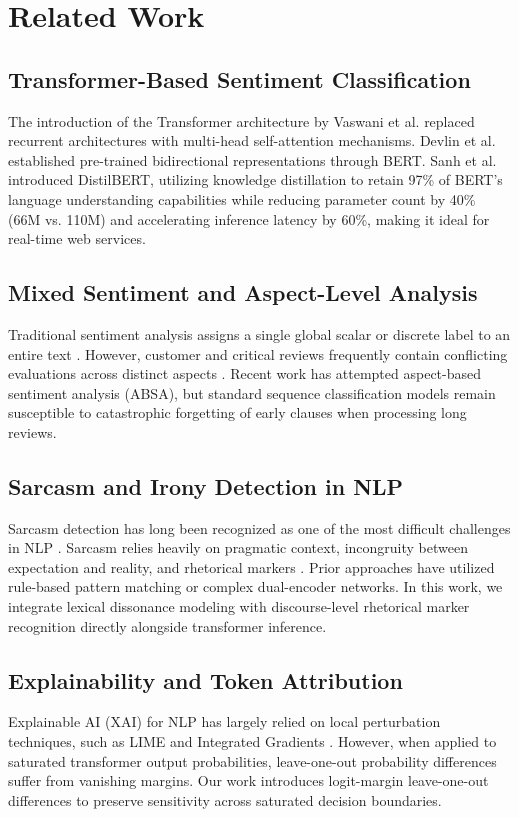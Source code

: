 \documentclass[conference]{IEEEtran}
\begin{document}
\section{Related Work}

\subsection{Transformer-Based Sentiment Classification}
The introduction of the Transformer architecture by Vaswani et al. \cite{vaswani2017attention} replaced recurrent architectures with multi-head self-attention mechanisms. Devlin et al. \cite{devlin2018bert} established pre-trained bidirectional representations through BERT. Sanh et al. \cite{sanh2019distilbert} introduced DistilBERT, utilizing knowledge distillation to retain 97\% of BERT's language understanding capabilities while reducing parameter count by 40\% (66M vs. 110M) and accelerating inference latency by 60\%, making it ideal for real-time web services.

\subsection{Mixed Sentiment and Aspect-Level Analysis}
Traditional sentiment analysis assigns a single global scalar or discrete label to an entire text \cite{pang2008opinion, liu2012sentiment}. However, customer and critical reviews frequently contain conflicting evaluations across distinct aspects \cite{pontiki2016semeval}. Recent work has attempted aspect-based sentiment analysis (ABSA), but standard sequence classification models remain susceptible to catastrophic forgetting of early clauses when processing long reviews.

\subsection{Sarcasm and Irony Detection in NLP}
Sarcasm detection has long been recognized as one of the most difficult challenges in NLP \cite{joshi2017measurement, van2018overview}. Sarcasm relies heavily on pragmatic context, incongruity between expectation and reality, and rhetorical markers \cite{campbell2012identifying}. Prior approaches have utilized rule-based pattern matching or complex dual-encoder networks. In this work, we integrate lexical dissonance modeling with discourse-level rhetorical marker recognition directly alongside transformer inference.

\subsection{Explainability and Token Attribution}
Explainable AI (XAI) for NLP has largely relied on local perturbation techniques, such as LIME \cite{ribeiro2016should} and Integrated Gradients \cite{sundararajan2017axiomatic}. However, when applied to saturated transformer output probabilities, leave-one-out probability differences suffer from vanishing margins. Our work introduces logit-margin leave-one-out differences to preserve sensitivity across saturated decision boundaries.
\end{document}
